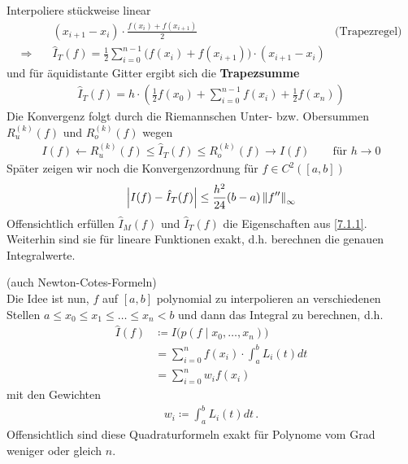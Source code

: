 Interpoliere stückweise linear
\label{im7.1.3}
\begin{align}\nonumber
  &(x_{i+1}-x_i)\cdot \frac{f(x_i)+f(x_{i+1})}{2} 
  &\text{(Trapezregel)}\\
  \Rightarrow\quad
  & \hat{I}_T(f) = \frac{1}{2}\sum_{i=0}^{n-1}
    \big(
    f(x_i)+f(x_{i+1})
    \big)
    \cdot (x_{i+1}-x_i)
    \label{VII.1.6}
\end{align}
und für äquidistante Gitter ergibt sich die \textbf{Trapezsumme}
\begin{gather}
  \hat{I}_T(f) = h\cdot\left( \frac{1}{2}f(x_0)
    +\sum_{i=0}^{n-1}f(x_i)
    +\frac{1}{2} f(x_n)
  \right)
  \label{VII.1.7}
\end{gather}
Die Konvergenz folgt durch die Riemannschen Unter- bzw. Obersummen
$R_u^{(k)}(f)$ und $R_o^{(k)}(f)$ wegen
\begin{gather*}
  I(f)\longleftarrow R_u^{(k)}(f)
  \leq \hat{I}_T(f)
  \leq R_o^{(k)}(f)\longrightarrow I(f)
  \qquad \text{für } h\longrightarrow 0
\end{gather*}
Später zeigen wir noch die Konvergenzordnung für $f\in C^2([a,b])$
\begin{gather}
  \left| I(f)-\hat{I}_T(f)\right| \leq \frac{h^2}{24}(b-a)\left\| f'' \right\|_\infty
  \label{VII.1.8}
\end{gather}
Offensichtlich erfüllen $\hat{I}_M(f)$ und $\hat{I}_T(f)$
die Eigenschaften aus \ref{7.1.1}.
Weiterhin sind sie für lineare Funktionen exakt,
d.h. berechnen die genauen Integralwerte.


(auch Newton-Cotes-Formeln)\\
Die Idee ist nun, $f$ auf $[a,b]$ polynomial zu interpolieren
an verschiedenen Stellen $a\leq x_0\leq x_1\leq \dots\leq x_n<b$
und dann das Integral zu berechnen, d.h.
\begin{align}\nonumber
  \hat{I}(f) &\coloneqq I\big( p(f\mid x_0,\dots, x_n)\big)\\\nonumber
             &=\sum_{i=0}^{n}f(x_i)
               \cdot \int_a^bL_i(t)dt\\
             &=\sum_{i=0}^{n} w_if(x_i)
               \label{VII.2.1}
\end{align}
mit den Gewichten 
\begin{gather}
  w_i\coloneqq \int_a^bL_i(t)dt\, .
  \label{VII.2.2}
\end{gather}
Offensichtlich sind diese Quadraturformeln exakt
für Polynome vom Grad weniger oder gleich $n$.

